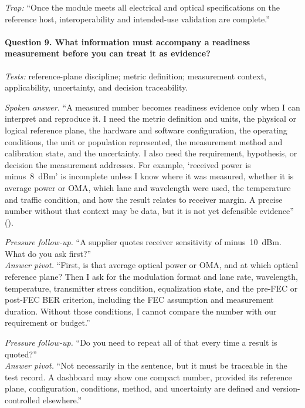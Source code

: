 \textit{Trap:} ``Once the module meets all electrical and optical
specifications on the reference host, interoperability and intended-use
validation are complete.''

\paragraph{Question 9. What information must accompany a readiness measurement
before you can treat it as evidence?}
\textit{Tests:} reference-plane discipline; metric definition; measurement
context, applicability, uncertainty, and decision traceability.

\textit{Spoken answer.}
``A measured number becomes readiness evidence only when I can interpret and
reproduce it. I need the metric definition and units, the physical or logical
reference plane, the hardware and software configuration, the operating
conditions, the unit or population represented, the measurement method and
calibration state, and the uncertainty. I also need the requirement,
hypothesis, or decision the measurement addresses. For example, `received power
is minus~8~dBm' is incomplete unless I know where it was measured, whether it is
average power or OMA, which lane and wavelength were used, the temperature and
traffic condition, and how the result relates to receiver margin. A precise
number without that context may be data, but it is not yet defensible evidence''
().

\textit{Pressure follow-up.} ``A supplier quotes receiver sensitivity of
minus~10~dBm. What do you ask first?''\\
\textit{Answer pivot.} ``First, is that average optical power or OMA, and at
which optical reference plane? Then I ask for the modulation format and lane
rate, wavelength, temperature, transmitter stress condition, equalization state,
and the pre-FEC or post-FEC BER criterion, including the FEC assumption and
measurement duration. Without those conditions, I cannot compare the number with
our requirement or budget.''

\textit{Pressure follow-up.} ``Do you need to repeat all of that every time a
result is quoted?''\\
\textit{Answer pivot.} ``Not necessarily in the sentence, but it must be
traceable in the test record. A dashboard may show one compact number, provided
its reference plane, configuration, conditions, method, and uncertainty are
defined and version-controlled elsewhere.''

